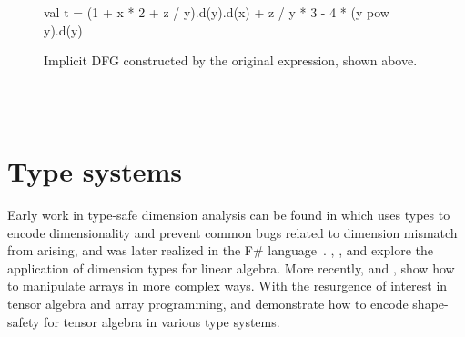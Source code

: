 %
\begin{figure}
    \begin{unbreakablekotlin}
        val t = (1 + x * 2 + z / y).d(y).d(x) + z / y * 3 - 4 * (y pow y).d(y)
    \end{unbreakablekotlin}
\end{figure}
\vspace{-40pt}
\begin{figure}
    \centering
    
    \caption{Implicit DFG constructed by the original expression, shown above.}
    \label{lst:edsl}
\end{figure}\\\\

\section{Type systems}\label{sec:type-systems}

Early work in type-safe dimension analysis can be found in \citet{kennedy1994dimension, kennedy1996programming} which uses types to encode dimensionality and prevent common bugs related to dimension mismatch from arising, and was later realized in the F\# language~\citep{kennedy2010types}. \citet{jay1996shape}, \citet{rittri1995dimension}, and \citet{zenger1997indexed} explore the application of dimension types for linear algebra. More recently, \citet{kiselyov2005number, kiselyov2010fun} and \citet{griffioen2015type}, show how to manipulate arrays in more complex ways. With the resurgence of interest in tensor algebra and array programming, \citet{chen2017typesafe} and \citet{rink2018modeling} demonstrate how to encode shape-safety for tensor algebra in various type systems.

